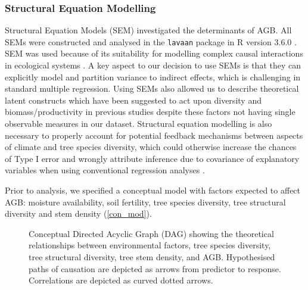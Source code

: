 \documentclass[11pt,a4paper]{article}
\begin{document}
\subsubsection{Structural Equation Modelling}

Structural Equation Models (SEM) investigated the determinants of AGB. All SEMs were constructed and analysed in the \verb|lavaan| package \citep{lavaan} in R version 3.6.0 \citep{R2019}. SEM was used because of its suitability for modelling complex causal interactions in ecological systems \citep{Lee2007}. A key aspect to our decision to use SEMs is that they can explicitly model and partition variance to indirect effects, which is challenging in standard multiple regression. Using SEMs also allowed us to describe theoretical latent constructs which have been suggested to act upon diversity and biomass/productivity in previous studies despite these factors not having single observable measures in our dataset. Structural equation modelling is also necessary to properly account for potential feedback mechanisms between aspects of climate and tree species diversity, which could otherwise increase the chances of Type I error and wrongly attribute inference due to covariance of explanatory variables when using conventional regression analyses \citep{Nachtigall2003}.

Prior to analysis, we specified a conceptual model with factors expected to affect AGB: moisture availability, soil fertility, tree species diversity, tree structural diversity and stem density (\autoref{con_mod}). 

\begin{figure}[H]
\centering
	
	\caption{Conceptual Directed Acyclic Graph (DAG) showing the theoretical relationships between environmental factors, tree species diversity, tree structural diversity, tree stem density, and AGB. Hypothesised paths of causation are depicted as arrows from predictor to response. Correlations are depicted as curved dotted arrows.}
	\label{con_mod}
\end{figure}
\end{document}
